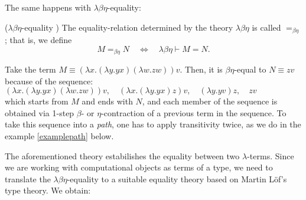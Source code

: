 \documentclass{entcs} \usepackage{entcsmacro}
\begin{document}
The same happens with $\lambda\beta\eta$-equality:\\ 
\begin{definition}($\lambda\beta\eta$-equality \cite{lambda})
The equality-relation determined by the theory $\lambda\beta\eta$ is called
$=_{\beta\eta}$; that is, we define
$$M=_{\beta\eta}N\quad\Leftrightarrow\quad\lambda\beta\eta\vdash M=N.$$
\end{definition}

\begin{example}
Take the term $M\equiv(\lambda x.(\lambda y.yx)(\lambda w.zw))v$. Then, it is $\beta\eta$-equal to $N\equiv zv$ because of the sequence:\\
$(\lambda x.(\lambda y.yx)(\lambda w.zw))v, \quad  (\lambda x.(\lambda y.yx)z)v, \quad   (\lambda y.yv)z , \quad zv$\\
which starts from $M$ and ends with $N$, and each member of the sequence is obtained via 1-step $\beta$- or $\eta$-contraction of a previous term in the sequence. To take this sequence into a {\em path\/}, one has to apply transitivity twice, as we do in the example \ref{examplepath} below.
\end{example}





The aforementioned theory estabilishes the equality between two $\lambda$-terms. Since we are working with computational objects as terms of a type, we need to translate the $\lambda\beta\eta$-equality to a suitable equality theory based on Martin L\"of's type theory. We obtain:
	
\end{document}

